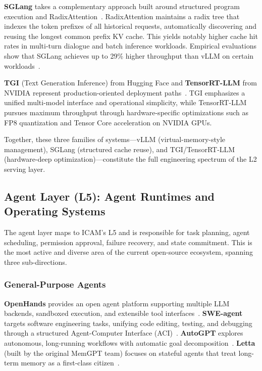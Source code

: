 \documentclass[11pt,a4paper]{article}
\begin{document}
\textbf{SGLang} takes a complementary approach built around structured program execution and RadixAttention~\cite{sglang2024,sglang_docs_2026}. RadixAttention maintains a radix tree that indexes the token prefixes of all historical requests, automatically discovering and reusing the longest common prefix KV cache. This yields notably higher cache hit rates in multi-turn dialogue and batch inference workloads. Empirical evaluations show that SGLang achieves up to 29\% higher throughput than vLLM on certain workloads~\cite{sglang2024}.

\textbf{TGI} (Text Generation Inference) from Hugging Face and \textbf{TensorRT-LLM} from NVIDIA represent production-oriented deployment paths~\cite{tgi_docs_2026,tensorrtllm_docs_2026}. TGI emphasizes a unified multi-model interface and operational simplicity, while TensorRT-LLM pursues maximum throughput through hardware-specific optimizations such as FP8 quantization and Tensor Core acceleration on NVIDIA GPUs.

Together, these three families of systems---vLLM (virtual-memory-style management), SGLang (structured cache reuse), and TGI/TensorRT-LLM (hardware-deep optimization)---constitute the full engineering spectrum of the L2 serving layer.

\subsection{Agent Layer (L5): Agent Runtimes and Operating Systems}
\label{sec:impl-agent}

The agent layer maps to ICAM's L5 and is responsible for task planning, agent scheduling, permission approval, failure recovery, and state commitment. This is the most active and diverse area of the current open-source ecosystem, spanning three sub-directions.

\subsubsection{General-Purpose Agents}

\textbf{OpenHands} provides an open agent platform supporting multiple LLM backends, sandboxed execution, and extensible tool interfaces~\cite{openhands_paper_2025}. \textbf{SWE-agent} targets software engineering tasks, unifying code editing, testing, and debugging through a structured Agent-Computer Interface (ACI)~\cite{sweagent2024}. \textbf{AutoGPT} explores autonomous, long-running workflows with automatic goal decomposition~\cite{autogpt_platform_2026}. \textbf{Letta} (built by the original MemGPT team) focuses on stateful agents that treat long-term memory as a first-class citizen~\cite{letta_stateful_2026}.
\end{document}
